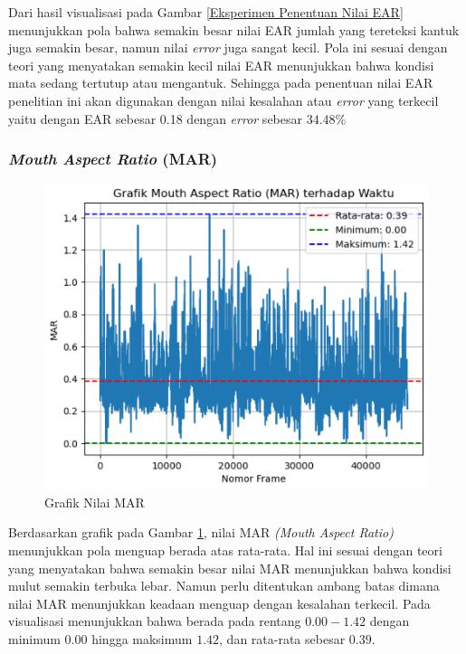 \begin{table}[H]
          Dari hasil visualisasi pada Gambar \ref{Eksperimen Penentuan Nilai EAR} menunjukkan pola bahwa semakin besar nilai EAR jumlah yang tereteksi kantuk juga semakin besar, namun nilai \textit{error }juga sangat kecil. Pola ini sesuai dengan teori yang menyatakan semakin kecil nilai EAR menunjukkan bahwa kondisi mata sedang tertutup atau mengantuk. Sehingga pada penentuan nilai EAR penelitian ini akan digunakan dengan nilai kesalahan atau \textit{error} yang terkecil yaitu dengan EAR sebesar 0.18 dengan \textit{error} sebesar $34.48\%$\\

    

\subsubsection{\textit{Mouth Aspect Ratio} (MAR)}
    
    
             \begin{figure}[H]
                 \centering
                 \includegraphics[width=0.8\linewidth]{figures/bab4/nilai mar.png}
                 \caption{Grafik Nilai MAR}
                 \label{Grafik Nilai MAR}
             \end{figure}



        
            Berdasarkan grafik pada Gambar \ref{Grafik Nilai MAR}, nilai MAR \textit{(Mouth Aspect Ratio)} menunjukkan pola menguap berada atas rata-rata. Hal ini sesuai dengan teori yang menyatakan bahwa semakin besar nilai MAR menunjukkan bahwa kondisi mulut semakin terbuka lebar. Namun perlu ditentukan ambang batas dimana nilai MAR menunjukkan keadaan menguap dengan kesalahan terkecil. Pada visualisasi menunjukkan bahwa berada pada rentang $0.00 - 1.42$ dengan minimum $0.00$ hingga maksimum $1.42$, dan rata-rata sebesar $0.39$. 
            

\end{table}
